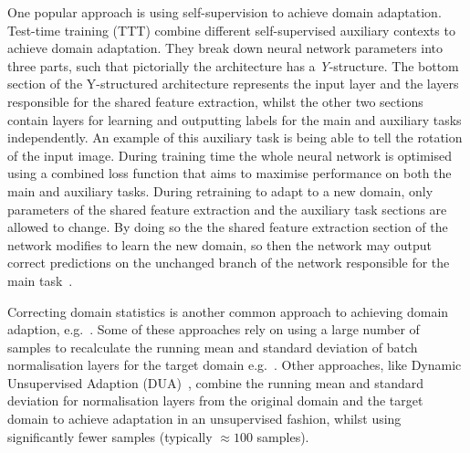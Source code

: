 One popular approach is using self-supervision to achieve domain adaptation. Test-time training (TTT) combine different self-supervised auxiliary contexts to achieve domain adaptation. They break down neural network parameters into three parts, such that pictorially the architecture has a \textit{Y}-structure. 
%
The bottom section of the Y-structured architecture represents the input layer and the layers responsible for the shared feature extraction, whilst the other two sections contain layers for learning and outputting labels for the main and auxiliary tasks independently. An example of this auxiliary task is being able to tell the rotation of the input image. 
%
During training time the whole neural network is optimised using a combined loss function that aims to maximise performance on both the main and auxiliary tasks. 
%
During retraining to adapt to a new domain, only parameters of the shared feature extraction and the auxiliary task sections are allowed to change. 
%
By doing so the the shared feature extraction section of the network modifies to learn the new domain, so then the network may output correct predictions on the unchanged branch of the network responsible for the main task~\cite{sun2020test, sun2019unsupervised}.

Correcting domain statistics is another common approach to achieving domain adaption, e.g.~\cite{mirza2022norm, schneider2020improving, nado2020evaluating, maria2017autodial}. 
%
%
Some of these approaches rely on using a large number of samples to recalculate the running mean and standard deviation of batch normalisation layers for the target domain e.g.~\cite{nado2020evaluating,schneider2020improving}.
%
Other approaches, like Dynamic Unsupervised Adaption (DUA)~\cite{mirza2022norm}, combine the running mean and standard deviation for normalisation layers from the original domain and the target domain to achieve adaptation in an unsupervised fashion, whilst using significantly fewer samples (typically $\approx100$ samples). 

